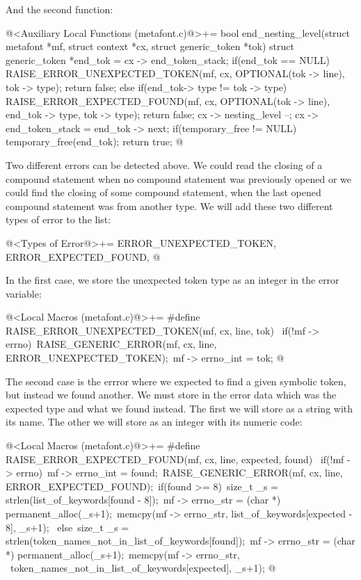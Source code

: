 And the second function:

\iniciocodigo
@<Auxiliary Local Functions (metafont.c)@>+=
bool end_nesting_level(struct metafont *mf, struct context *cx,
                       struct generic_token *tok){
  struct generic_token *end_tok = cx -> end_token_stack;
  if(end_tok == NULL){
    RAISE_ERROR_UNEXPECTED_TOKEN(mf, cx, OPTIONAL(tok -> line), tok -> type);
    return false;
  }
  else if(end_tok-> type != tok -> type){
    RAISE_ERROR_EXPECTED_FOUND(mf, cx, OPTIONAL(tok -> line),
                               end_tok -> type, tok -> type);
    return false;
  }
  cx -> nesting_level --;
  cx -> end_token_stack = end_tok -> next;
  if(temporary_free != NULL)
    temporary_free(end_tok);
  return true;
}
@
\fimcodigo

Two different errors can be detected above. We could read the closing
of a compound statement when no compound statement was previously
opened or we could find the closing of some compound statement, when
the last opened compound statement was from another type. We will add
these two different types of error to the list:

\iniciocodigo
@<Types of Error@>+=
ERROR_UNEXPECTED_TOKEN, ERROR_EXPECTED_FOUND,
@
\fimcodigo

In the first case, we store the unexpected token type as an integer in
the error variable:

\iniciocodigo
@<Local Macros (metafont.c)@>+=
#define RAISE_ERROR_UNEXPECTED_TOKEN(mf, cx, line, tok) {\
  if(!mf -> errno){\
    RAISE_GENERIC_ERROR(mf, cx, line, ERROR_UNEXPECTED_TOKEN);\
    mf -> errno_int = tok;}}
@
\fimcodigo

The second case is the errror where we expected to find a given
symbolic token, but instead we found another. We must store in the
error data which was the expected type and what we found instead. The
first we will store as a string with its name. The other we will
store as an integer with its numeric code:

\iniciocodigo
@<Local Macros (metafont.c)@>+=
#define RAISE_ERROR_EXPECTED_FOUND(mf, cx, line, expected, found) {\
  if(!mf -> errno){\
    mf -> errno_int = found;\
    RAISE_GENERIC_ERROR(mf, cx, line, ERROR_EXPECTED_FOUND);\
    if(found >= 8){\
      size_t _s = strlen(list_of_keywords[found - 8]);\
      mf -> errno_str = (char *) permanent_alloc(_s+1);\
      memcpy(mf -> errno_str, list_of_keywords[expected - 8], _s+1);\
    } else{\
      size_t _s = strlen(token_names_not_in_list_of_keywords[found]);\
      mf -> errno_str = (char *) permanent_alloc(_s+1);\
      memcpy(mf -> errno_str, \
             token_names_not_in_list_of_keywords[expected], _s+1);}}}
@
\fimcodigo

